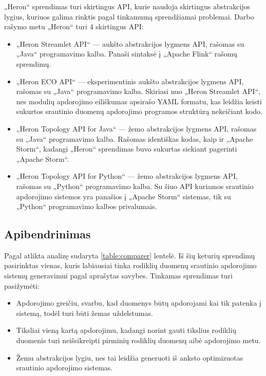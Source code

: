 \documentclass{VUMIFPSbakalaurinis}
\begin{document}
„Heron“ sprendimas turi skirtingus API, kurie naudoja skirtingus abstrakcijos lygius, kuriuos galima rinktis pagal tinkamumą sprendžiamai problemai. Darbo rašymo metu „Heron“ turi 4 skirtingus API:
\begin{itemize}
    \item „Heron Streamlet API“ — aukšto abstrakcijos lygmens API, rašomas su „Java“ programavimo kalba. Panaši sintaksė į „Apache Flink“ rašomų sprendimų.
    \item „Heron ECO API“ — eksperimentinis aukšto abstrakcijos lygmens API, rašomas su „Java“ programavimo kalba. Skiriasi nuo „Heron Streamlet API“, nes modulių apdorojimo eiliškumas apsirašo YAML formatu, kas leidžia keisti sukurtos srautinio duomenų apdorojimo programos struktūrą nekeičiant kodo.
    \item „Heron Topology API for Java“ — žemo abstrakcijos lygmens API, rašomas su „Java“ programavimo kalba. Rašomas identiškas kodas, kaip ir „Apache Storm“, kadangi „Heron“ sprendimas buvo sukurtas siekiant pagerinti „Apache Storm“.
    \item „Heron Topology API for Python“ — žemo abstrakcijos lygmens API, rašomas su „Python“ programavimo kalba. Su šiuo API kuriamos srautinio apdorojimo sistemos yra panašios į „Apache Storm“ sistemas, tik su „Python“ programavimo kalbos privalumais.
\end{itemize}  


\subsection{Apibendrinimas}

Pagal atlikta analizę sudaryta \ref{table:comparer} lentelė. Iš šių keturių sprendimų pasirinktas vienas, kuris labiausiai tinka rodiklių duomenų srautinio apdorojimo sistemų generavimui pagal aprašytas savybes. Tinkamas sprendimas turi pasižymėti: 
\begin{itemize}
    \item Apdorojimo greičiu, svarbu, kad duomenys būtų apdorojami kai tik patenka į sistemą, todėl turi būti žemas uždelstumas.
    \item Tiksliai vieną kartą apdorojimu, kadangi norint gauti tikslius rodiklių duomenis turi neišsikreipti pirminių rodiklių duomenų aibė apdorojimo metu.
    \item Žemu abstrakcijos lygiu, nes tai leidžia generuoti iš anksto optimizuotas srautinio apdorojimo sistemas.  
\end{itemize} 
\end{document}
